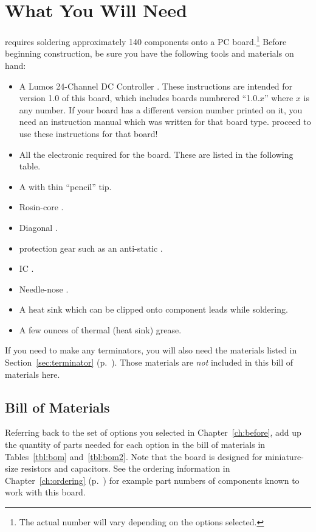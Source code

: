 \documentclass[letterpaper,twoside,onecolumn,openright,final]{memoir}
\begin{document}
\chapter{What You Will Need}\label{ch:materials}
 requires soldering approximately 140 components onto a PC board.\footnote{The actual number will vary depending on the options selected.}  Before beginning construction, be sure you have the following tools and materials on hand:
\begin{itemize}
	\item A Lumos 24-Channel DC Controller . 
		These instructions are intended for version
		1.0 of this board, which includes boards numbrered ``1.0.$x$'' where $x$ is any
		number.  If your board has a different version number printed on it, you need an
		instruction manual which was written for that board type.   proceed to
		use these instructions for that board!
	\item All the electronic  required for the board.  These are listed in the
		following table.
	\item A  with thin ``pencil'' tip.
	\item Rosin-core .  
	\item Diagonal .
	\item {} protection gear such as an anti-static .
	\item IC .
	\item Needle-nose .
	\item A heat sink which can be clipped onto component leads while soldering.
	\item A few ounces of thermal (heat sink) grease.
\end{itemize}

If you need to make any  terminators, you will also need the materials listed in Section~\ref{sec:terminator} (p.~\pageref{sec:terminator}).  Those materials are \emph{not} included in this bill of materials here.

\section{Bill of Materials}
Referring back to the set of options you selected in Chapter~\ref{ch:before}, add up the quantity of
parts needed for each option in the bill of materials in Tables~\ref{tbl:bom}
and~\ref{tbl:bom2}.
Note that the board is designed for miniature-size resistors and capacitors.  See the
ordering information in Chapter~\ref{ch:ordering} (p.~\pageref{ch:ordering}) for example part numbers of
components known to work with this board.
\end{document}
